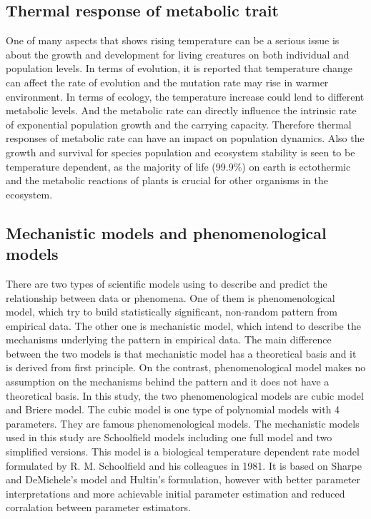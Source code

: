 \documentclass[12pt,a4paper]{article}
\begin{document}
\subsection{Thermal response of metabolic trait}
One of many aspects that shows rising temperature can be a serious issue is about the growth and development for living creatures on both individual and population levels. In terms of evolution, it is reported that temperature change can affect the rate of evolution and the mutation rate may rise in warmer environment. 
\cite{evolution}
In terms of ecology, the temperature increase could lend to different metabolic levels. And the metabolic rate can directly influence the intrinsic rate of exponential population growth and the carrying capacity. 
\cite{ecology}
Therefore thermal responses of metabolic rate can have an impact on population dynamics. Also the growth and survival for species population and ecosystem stability is seen to be temperature dependent, as the majority of life (99.9\%) on earth is ectothermic and the metabolic reactions of plants is crucial for other organisms in the ecosystem.
\subsection{Mechanistic models and phenomenological models}
There are two types of scientific models using to describe and predict the relationship between data or phenomena. One of them is phenomenological model, which try to build statistically significant, non-random pattern from empirical data. The other one is mechanistic model, which intend to describe the mechanisms underlying the pattern in empirical data. The main difference between the two models is that mechanistic model has a theoretical basis and it is derived from first principle. On the contrast, phenomenological model makes no assumption on the mechanisms behind the pattern and it does not have a theoretical basis. 
In this study, the two phenomenological models are cubic model and Briere model. The cubic model is one type of polynomial models with 4 parameters. They are famous phenomenological models. The mechanistic models used in this study are Schoolfield models including one full model and two simplified versions. This model is a biological temperature dependent rate model formulated by R. M. Schoolfield and his colleagues in 1981. It is based on Sharpe and DeMichele’s model and Hultin’s formulation, however with better parameter interpretations and more achievable initial parameter estimation and reduced corralation between parameter estimators.
\cite{schoolfield}
\end{document}
